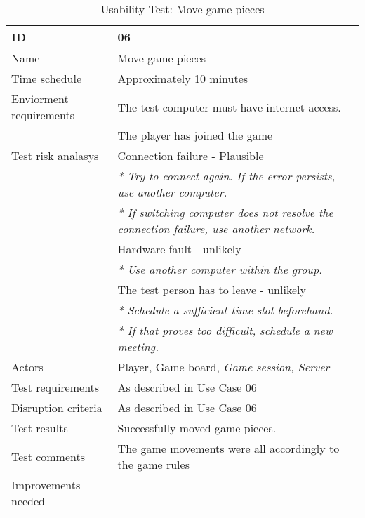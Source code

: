 {\footnotesize
\begin{table}[H]
\begin{tabular}{| p{5cm} | p{10cm} |}\hline
	\textbf{ID}	& \textbf{06} \\ \hline
	Name		& Move game pieces\\ \hline
	Time schedule	& Approximately 10 minutes\\ \hline
	Enviorment requirements 
		& The test computer must have internet access. \\ 
		& The player has joined the game\\ \hline
	Test risk analasys 
		& Connection failure - Plausible \\
		& \emph{* Try to connect again. If the error persists, use another computer.} \\
		& \emph{* If switching computer does not resolve the connection failure, use another network.}\\
		& Hardware fault - unlikely \\
		& \emph{* Use another computer within the group.} \\
		& The test person has to leave - unlikely \\
		& \emph{* Schedule a sufficient time slot beforehand.} \\
		& \emph{* If that proves too difficult, schedule a new meeting.}\\ \hline
	Actors	& Player, Game board, \emph{Game session, Server}\\ \hline
	Test requirements & As described in Use Case 06 \\ \hline
	Disruption criteria & As described in Use Case 06  \\ \hline
	Test results & Successfully moved game pieces.
		& \\ \hline
	Test comments & The game movements were all accordingly to the game rules
		& \\ \hline
	Improvements needed
		& \\ \hline
\end{tabular}


\caption{Usability Test: Move game pieces}
\label{fig:usability_test_6}
\end{table}}



